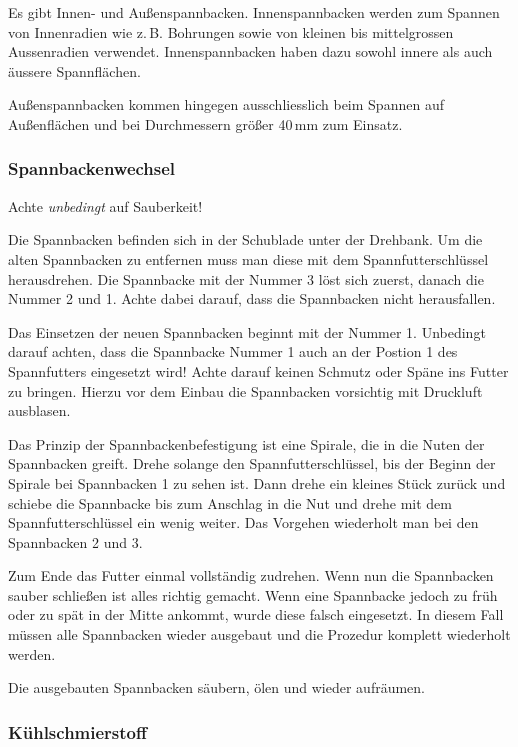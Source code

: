 \documentclass{\basedir/fablab-document}
\begin{document}
Es gibt Innen- und Außenspannbacken.
Innenspannbacken werden zum Spannen von Innenradien wie z.\,B. Bohrungen sowie von kleinen bis mittelgrossen Aussenradien verwendet. Innenspannbacken haben dazu sowohl innere als auch äussere Spannflächen.

Außenspannbacken kommen hingegen ausschliesslich beim Spannen auf Außenflächen und bei Durchmessern größer 40\,mm zum Einsatz.


\subsubsection{Spannbackenwechsel}
\label{zerspanung:spannbackenwechsel}
Achte \emph{unbedingt} auf Sauberkeit!
 
Die Spannbacken befinden sich in der Schublade unter der Drehbank.
Um die alten Spannbacken zu entfernen muss man diese mit dem Spannfutterschlüssel herausdrehen.
Die Spannbacke mit der Nummer 3 löst sich zuerst, danach die Nummer 2 und 1.
Achte dabei darauf, dass die Spannbacken nicht herausfallen.

Das Einsetzen der neuen Spannbacken beginnt mit der Nummer 1.
Unbedingt darauf achten, dass die Spannbacke Nummer 1 auch an der Postion 1 des Spannfutters eingesetzt wird!
Achte darauf keinen Schmutz oder Späne ins Futter zu bringen. Hierzu vor dem Einbau die Spannbacken vorsichtig mit Druckluft ausblasen.

Das Prinzip der Spannbackenbefestigung ist eine Spirale, die in die Nuten der Spannbacken greift.
Drehe solange den Spannfutterschlüssel, bis der Beginn der Spirale bei Spannbacken 1 zu sehen ist.
Dann drehe ein kleines Stück zurück und schiebe die Spannbacke bis zum Anschlag in die Nut und drehe mit dem Spannfutterschlüssel ein wenig weiter.
Das Vorgehen wiederholt man bei den Spannbacken 2 und 3.

Zum Ende das Futter einmal vollständig zudrehen.
Wenn nun die Spannbacken sauber schließen ist alles richtig gemacht.
Wenn eine Spannbacke jedoch zu früh oder zu spät in der Mitte ankommt, wurde diese falsch eingesetzt.
In diesem Fall müssen alle Spannbacken wieder ausgebaut und die Prozedur komplett wiederholt werden.

Die ausgebauten Spannbacken säubern, ölen und wieder aufräumen.

\subsubsection{Kühlschmierstoff}
\end{document}
